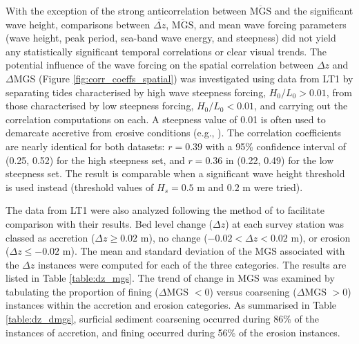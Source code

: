 \documentclass[jmse,article,submit,pdftex,moreauthors]{Definitions/mdpi}
\begin{document}
With the exception of the strong anticorrelation between $\overline{\mathrm{MGS}}$ and the significant wave height, comparisons between $\overline{\Delta z}$, $\overline{\mathrm{MGS}}$, and mean wave forcing parameters (wave height, peak period, sea-band wave energy, and steepness) did not yield any statistically significant temporal correlations or clear visual trends. The potential influence of the wave forcing on the spatial correlation between $\Delta z$ and $\Delta$MGS (Figure \ref{fig:corr_coeffs_spatial}) was investigated using data from LT1 by separating tides characterised by high wave steepness forcing, $H_0/L_0 > 0.01$, from those characterised by low steepness forcing, $H_0/L_0 < 0.01$, and carrying out the correlation computations on each. A steepness value of 0.01 is often used to demarcate accretive from erosive conditions (e.g., \citep{Masselink_etal2007}). The correlation coefficients are nearly identical for both datasets: $r=0.39$ with a 95\% confidence interval of (0.25, 0.52) for the high steepness set, and $r=0.36$ in (0.22, 0.49) for the low steepness set. The result is comparable when a significant wave height threshold is used instead (threshold values of $H_{s} = 0.5$ m and $0.2$ m were tried).

The data from LT1 were also analyzed following the method of \citet{Masselink_etal2007} to facilitate comparison with their results. Bed level change ($\Delta z$) at each survey station was classed as accretion ($\Delta z \geq 0.02$ m), no change ($-0.02 < \Delta z < 0.02$ m), or erosion ($\Delta z \leq -0.02$ m). The mean and standard deviation of the MGS associated with the $\Delta z$ instances were computed for each of the three categories. The results are listed in Table \ref{table:dz_mgs}. The trend of change in MGS was examined by tabulating the proportion of fining ($\Delta$MGS $< 0$) versus coarsening ($\Delta$MGS $> 0$) instances within the accretion and erosion categories. As summarised in Table \ref{table:dz_dmgs}, surficial sediment coarsening occurred during 86\% of the instances of accretion, and fining occurred during 56\% of the erosion instances. %
\end{document}
